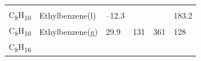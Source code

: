 \documentclass[
]{book}
\theoremstyle{definition}
\theoremstyle{definition}
\theoremstyle{definition}
\theoremstyle{remark}
\begin{document}
\begin{longtable}[]{@{}llllll@{}}
\begin{minipage}[t]{0.15\columnwidth}
\strut
\end{minipage} & \begin{minipage}[t]{0.14\columnwidth}\raggedright
\strut
\end{minipage} & \begin{minipage}[t]{0.14\columnwidth}\raggedright
\strut
\end{minipage}\tabularnewline
\begin{minipage}[t]{0.07\columnwidth}\raggedright
C\textsubscript{8}H\textsubscript{10}\strut
\end{minipage} & \begin{minipage}[t]{0.17\columnwidth}\raggedright
Ethylbenzene(l)\strut
\end{minipage} & \begin{minipage}[t]{0.15\columnwidth}\raggedright
--12.3\strut
\end{minipage} & \begin{minipage}[t]{0.15\columnwidth}\raggedright
\strut
\end{minipage} & \begin{minipage}[t]{0.14\columnwidth}\raggedright
\strut
\end{minipage} & \begin{minipage}[t]{0.14\columnwidth}\raggedright
183.2\strut
\end{minipage}\tabularnewline
\begin{minipage}[t]{0.07\columnwidth}\raggedright
C\textsubscript{8}H\textsubscript{10}\strut
\end{minipage} & \begin{minipage}[t]{0.17\columnwidth}\raggedright
Ethylbenzene(g)\strut
\end{minipage} & \begin{minipage}[t]{0.15\columnwidth}\raggedright
29.9\strut
\end{minipage} & \begin{minipage}[t]{0.15\columnwidth}\raggedright
131\strut
\end{minipage} & \begin{minipage}[t]{0.14\columnwidth}\raggedright
361\strut
\end{minipage} & \begin{minipage}[t]{0.14\columnwidth}\raggedright
128\strut
\end{minipage}\tabularnewline
\begin{minipage}[t]{0.07\columnwidth}\raggedright
C\textsubscript{8}H\textsubscript{16}\strut
\end{minipage} & \begin{minipage}[t]{0.17\columnwidth}\raggedright

\end{minipage}
\end{longtable}
\end{document}
